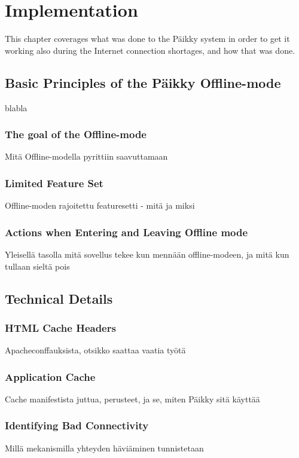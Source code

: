 
\chapter{Implementation}
This chapter coverages what was done to the Päikky system in order to get it working also during the Internet connection shortages, and how that was done. 


\section{Basic Principles of the Päikky Offline-mode}
blabla

\subsection{The goal of the Offline-mode}
Mitä Offline-modella pyrittiin saavuttamaan

\subsection{Limited Feature Set}
Offline-moden rajoitettu featuresetti - mitä ja miksi

\subsection{Actions when Entering and Leaving Offline mode}
Yleisellä tasolla mitä sovellus tekee kun mennään offline-modeen, ja mitä kun tullaan sieltä pois

\section{Technical Details}

\subsection{HTML Cache Headers}
Apacheconffauksista, otsikko saattaa vaatia työtä


\subsection{Application Cache}
Cache manifestista juttua, perusteet, ja se, miten Päikky sitä käyttää

\subsection{Identifying Bad Connectivity}
Millä mekanismilla yhteyden häviäminen tunnistetaan


